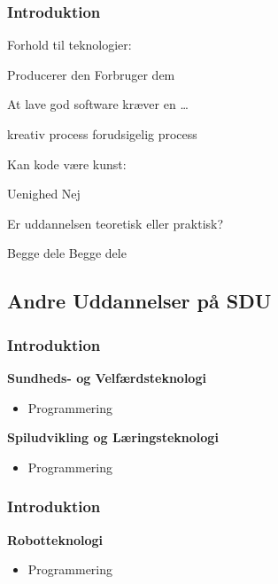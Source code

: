 {\begin{frame}[fragile]
  \frametitle{Introduktion }
  \vspace{-1mm}
  Forhold til teknologier:
  \begin{itemize}
     Producerer den
     Forbruger dem
  \end{itemize}
  
  \pause
  \vspace{2mm}
  At lave god software kræver en \ldots
  \begin{itemize}
     kreativ process
     forudsigelig process
  \end{itemize}
  
  \pause
  \vspace{2mm}
  Kan kode være kunst:
  \begin{itemize}
     Uenighed
     Nej
  \end{itemize}
  
  \pause
  \vspace{2mm}
  Er uddannelsen teoretisk eller praktisk?
  \begin{itemize}
     Begge dele
     Begge dele
  \end{itemize}
\end{frame}

\subsection{Andre Uddannelser på SDU}
\begin{frame}[fragile]
  \frametitle{Introduktion }
  \vspace{7mm}
  \textbf{Sundheds- og Velfærdsteknologi}
  \begin{itemize}
     BSc og MSc
     Anatomi, Bevægelse, Fysiologi, Medicinsk udstyr
    \item Programmering
  \end{itemize}
  
  \pause
  \vspace{9mm}
  \textbf{Spiludvikling og Læringsteknologi}
  \begin{itemize}
     BSc og MSc
     Læringsteori, Spilprogrammering, Virtual \& Augmented Reality, Robotik, Historiefortælling
    \item Programmering
  \end{itemize}
\end{frame}
\begin{frame}[fragile]
  \frametitle{Introduktion }
  \vspace{7mm}
  \textbf{Robotteknologi}
  \begin{itemize}
     BSc (både diplom og civil) og MSc
     Mekanik, Elektronik, Kinematik, Radio
    \item Programmering
  \end{itemize}
  

\end{frame}}
